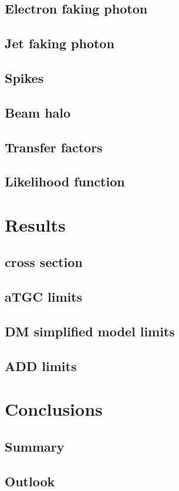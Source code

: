 \documentclass[oneside, letterpaper, 12pt, oldfontcommands]{memoir}
\begin{document}
\section{Electron faking photon} \label{sec:background_estimation_elefake}
\section{Jet faking photon} \label{sec:background_estimation_jetfake}
\section{Spikes} \label{sec:background_estimation_spikes}
\section{Beam halo} \label{sec:background_estimation_halo}
\section{Transfer factors} \label{sec:background_estimation_transfer_factors}
\section{Likelihood function} \label{sec:background_estimation_likelihood}

\chapter{Results} \label{chap:results}
\section{\texorpdfstring{\zinvg}{Z(νν)γ} cross section} \label{sec:results_znng_xsec}
\section{aTGC limits} \label{sec:results_aTGC}
\section{DM simplified model limits} \label{sec:results_DM}
\section{ADD limits} \label{sec:results_ADD}

\chapter{Conclusions} \label{chap:conclusions}
\section{Summary} \label{sec:conclusions_summary}
\section{Outlook} \label{sec:conclusions_outlook}



\end{document}
